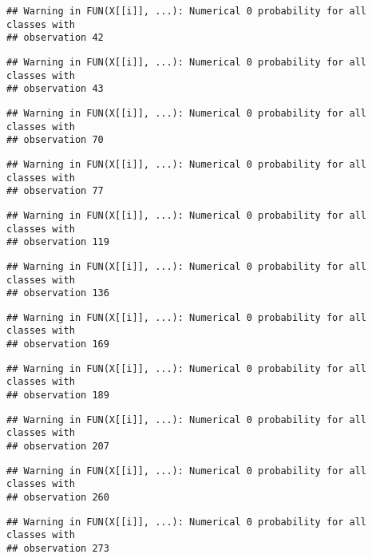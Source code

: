 \documentclass[]{article}
\begin{document}
\begin{verbatim}
## Warning in FUN(X[[i]], ...): Numerical 0 probability for all classes with
## observation 42
\end{verbatim}

\begin{verbatim}
## Warning in FUN(X[[i]], ...): Numerical 0 probability for all classes with
## observation 43
\end{verbatim}

\begin{verbatim}
## Warning in FUN(X[[i]], ...): Numerical 0 probability for all classes with
## observation 70
\end{verbatim}

\begin{verbatim}
## Warning in FUN(X[[i]], ...): Numerical 0 probability for all classes with
## observation 77
\end{verbatim}

\begin{verbatim}
## Warning in FUN(X[[i]], ...): Numerical 0 probability for all classes with
## observation 119
\end{verbatim}

\begin{verbatim}
## Warning in FUN(X[[i]], ...): Numerical 0 probability for all classes with
## observation 136
\end{verbatim}

\begin{verbatim}
## Warning in FUN(X[[i]], ...): Numerical 0 probability for all classes with
## observation 169
\end{verbatim}

\begin{verbatim}
## Warning in FUN(X[[i]], ...): Numerical 0 probability for all classes with
## observation 189
\end{verbatim}

\begin{verbatim}
## Warning in FUN(X[[i]], ...): Numerical 0 probability for all classes with
## observation 207
\end{verbatim}

\begin{verbatim}
## Warning in FUN(X[[i]], ...): Numerical 0 probability for all classes with
## observation 260
\end{verbatim}

\begin{verbatim}
## Warning in FUN(X[[i]], ...): Numerical 0 probability for all classes with
## observation 273
\end{verbatim}
\end{document}
